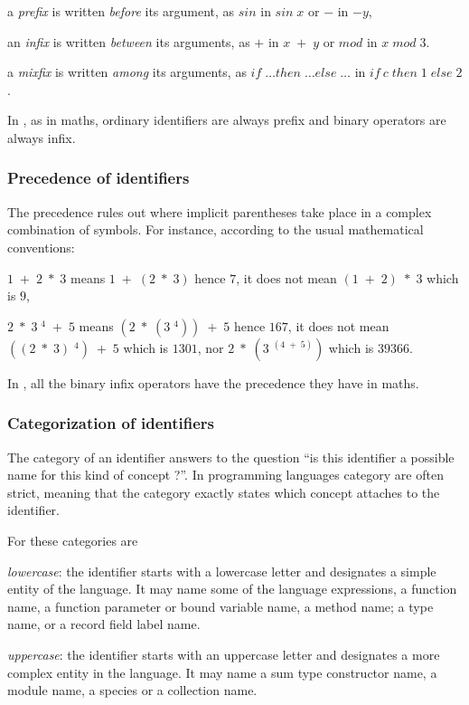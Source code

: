 \begin{citemize}
\item a {\em prefix} is written {\em before} its argument, as $sin$ in
 $sin\; x$ or $-$ in $- y$,
\item an {\em infix} is written {\em between} its arguments, as $+$ in
 $x\; +\; y$ or $mod$ in $x\; mod \;3$.
\item a {\em mixfix} is written {\em among} its arguments, as
  $if\; \ldots then\; \ldots else\; \ldots$ in
  $if\ c\; then\; 1\; else\; 2 $.
\end{citemize}

In {\focal}, as in maths, ordinary identifiers are always prefix and binary operators are
always infix.

\subsubsection{Precedence of identifiers}

The precedence rules out where implicit parentheses take place in a
complex combination of symbols. For instance, according to the usual mathematical
conventions:
\begin{citemize}
\item $1\; +\; 2\; *\; 3$  means $1\; +\; (2\; *\; 3)$ hence $7$,
      it does not mean $(1\; +\; 2)\; *\; 3$ which is $9$,
\item $2\; *\; 3\; ^4\; +\; 5$ means
      $(2\; *\; (3\; ^4))\; +\; 5$ hence $167$, it does not mean
      $((2\; *\; 3)\; ^4)\; +\; 5$ which is $1301$,
      nor $2\; *\; (3\; ^(4\; +\; 5))$ which is $39366$.
\end{citemize}

In {\focal}, all the binary infix operators have the precedence they have in maths.

\subsubsection{Categorization of identifiers}

The category of an identifier answers to the question ``is this identifier a
possible name for this kind of concept ?''.
In programming languages category are often strict, meaning that the category
exactly states which concept attaches to the identifier.

For {\focal} these categories are
\begin{citemize}
\item {\em lowercase}: the identifier starts with a lowercase letter and
  designates a simple entity of the language. It may name some of
  the language expressions, a function name, a function parameter or bound
  variable name, a method name; a type name, or a record field label name.

\item {\em uppercase}: the identifier starts with an uppercase letter and
  designates a more complex entity in the language. It may name a sum type
  constructor name, a module name, a species or a collection name.
\end{citemize}

